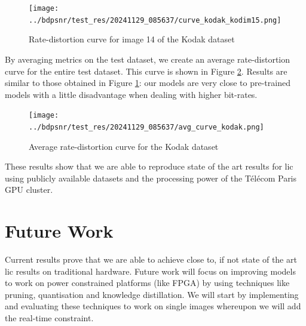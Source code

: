 \begin{figure}
    \centering
    \texttt{[image: ../bdpsnr/test\_res/20241129\_085637/curve\_kodak\_kodim15.png]}
    \caption{Rate-distortion curve for image 14 of the Kodak dataset}
    \label{bdpsnr_3}
\end{figure}

By averaging metrics on the test dataset, we create an average rate-distortion curve for the entire test dataset. This curve is shown in Figure \ref{bdpsnr_4}. Results are similar to those obtained in Figure \ref{bdpsnr_3}: our models are very close to pre-trained models with a little disadvantage when dealing with higher bit-rates.

\begin{figure}
    \centering
    \texttt{[image: ../bdpsnr/test\_res/20241129\_085637/avg\_curve\_kodak.png]}
    \caption{Average rate-distortion curve for the Kodak dataset}
    \label{bdpsnr_4}
\end{figure}

These results show that we are able to reproduce state of the art results for \acrshort{lic} using publicly available datasets and the processing power of the Télécom Paris GPU cluster.

\section{Future Work}
Current results prove that we are able to achieve close to, if not state of the art \acrshort{lic} results on traditional hardware. Future work will focus on improving models to work on power constrained platforms (like FPGA) by using techniques like pruning, quantisation and knowledge distillation. We will start by implementing and evaluating these techniques to work on single images whereupon we will add the real-time constraint.